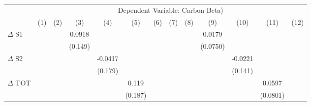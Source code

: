 {
\def\sym#1{\ifmmode^{#1}\else\(^{#1}\)\fi}
\begin{tabular}{l*{12}{c}}
\hline\hline
                    &\multicolumn{12}{c}{Dependent Variable: Carbon Beta) }                                                                                                                                                                                                                 \\\cmidrule(lr){2-13}
                    &\multicolumn{1}{c}{(1)}         &\multicolumn{1}{c}{(2)}         &\multicolumn{1}{c}{(3)}         &\multicolumn{1}{c}{(4)}         &\multicolumn{1}{c}{(5)}         &\multicolumn{1}{c}{(6)}         &\multicolumn{1}{c}{(7)}         &\multicolumn{1}{c}{(8)}         &\multicolumn{1}{c}{(9)}         &\multicolumn{1}{c}{(10)}         &\multicolumn{1}{c}{(11)}         &\multicolumn{1}{c}{(12)}         \\
\hline
$\Delta$ S1         &                     &                     &      0.0918         &                     &                     &                     &                     &                     &      0.0179         &                     &                     &                     \\
                    &                     &                     &     (0.149)         &                     &                     &                     &                     &                     &    (0.0750)         &                     &                     &                     \\
$\Delta$ S2         &                     &                     &                     &     -0.0417         &                     &                     &                     &                     &                     &     -0.0221         &                     &                     \\
                    &                     &                     &                     &     (0.179)         &                     &                     &                     &                     &                     &     (0.141)         &                     &                     \\
$\Delta$ TOT        &                     &                     &                     &                     &       0.119         &                     &                     &                     &                     &                     &      0.0597         &                     \\
                    &                     &                     &                     &                     &     (0.187)         &                     &                     &                     &                     &                     &    (0.0801)         &                     \\

\end{tabular}}
